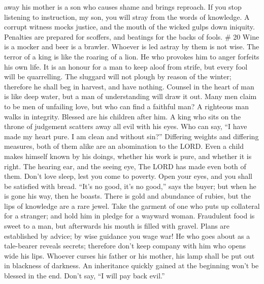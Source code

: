 away his mother is a son who causes shame and brings reproach.
 If you stop listening to instruction, my son, you will
stray from the words of knowledge.  A corrupt witness
mocks justice, and the mouth of the wicked gulps down iniquity.
 Penalties are prepared for scoffers, and beatings for
the backs of fools. \# 20  Wine is a mocker and beer is a
brawler. Whoever is led astray by them is not wise.  The
terror of a king is like the roaring of a lion. He who provokes him to
anger forfeits his own life.  It is an honour for a man to
keep aloof from strife, but every fool will be quarrelling.
 The sluggard will not plough by reason of the winter;
therefore he shall beg in harvest, and have nothing. 
Counsel in the heart of man is like deep water, but a man of
understanding will draw it out.  Many men claim to be men
of unfailing love, but who can find a faithful man?  A
righteous man walks in integrity. Blessed are his children after him.
 A king who sits on the throne of judgement scatters away
all evil with his eyes.  Who can say, ``I have made my
heart pure. I am clean and without sin?''  Differing
weights and differing measures, both of them alike are an abomination to
the LORD.  Even a child makes himself known by his
doings, whether his work is pure, and whether it is right.
 The hearing ear, and the seeing eye, The LORD has made
even both of them.  Don't love sleep, lest you come to
poverty. Open your eyes, and you shall be satisfied with bread.
 ``It's no good, it's no good,'' says the buyer; but when
he is gone his way, then he boasts.  There is gold and
abundance of rubies, but the lips of knowledge are a rare jewel.
 Take the garment of one who puts up collateral for a
stranger; and hold him in pledge for a wayward woman. 
Fraudulent food is sweet to a man, but afterwards his mouth is filled
with gravel.  Plans are established by advice; by wise
guidance you wage war!  He who goes about as a
tale-bearer reveals secrets; therefore don't keep company with him who
opens wide his lips.  Whoever curses his father or his
mother, his lamp shall be put out in blackness of darkness.
 An inheritance quickly gained at the beginning won't be
blessed in the end.  Don't say, ``I will pay back evil.''
